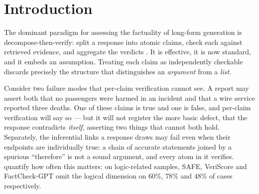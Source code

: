 \begin{abstract}
satisfies every satisfiable ladder ordering; we adopt it as the headline score, with the mean
marginal kept as the diagnostic that locates an incoherence. A third natural candidate is worse still, since a score
asking whether asserted relations are honoured is maximized by asserting nothing. Claim priors
come from an existing factuality pipeline, making coherence and factuality two stages over one
decomposition rather than competing scores. Empirically, on a corpus of response families whose
relative coherence ordering is fixed by construction, the readouts recover $82.7\%$ of the
declared orderings from gold relation graphs and $34.7$--$37.1\%$ from graphs mined out of the
response text; since the two conditions differ only in the relation graph, the gap localizes the open
problem in relation extraction rather than in the probabilistic model.
\end{abstract}

\section{Introduction}
\label{sec-intro}

The dominant paradigm for assessing the factuality of long-form generation is
decompose-then-verify: split a response into atomic claims, check each against retrieved
evidence, and aggregate the verdicts \citep{factscore,safe,veriscore}. It is effective, it is now
standard, and it embeds an assumption. Treating each claim as independently checkable discards
precisely the structure that distinguishes an \emph{argument} from a \emph{list}.

Consider two failure modes that per-claim verification cannot see. A report may assert both that
no passengers were harmed in an incident and that a wire service reported three deaths. One of
these claims is true and one is false, and per-claim verification will say so --- but it will not
register the more basic defect, that the response contradicts \emph{itself}, asserting two things
that cannot both hold. Separately, the inferential links a response draws may fail even when
their endpoints are individually true: a chain of accurate statements joined by a spurious
``therefore'' is not a sound argument, and every atom in it verifies. \citet{lorefact} quantify
how often this matters: on logic-related samples, SAFE, VeriScore and FactCheck-GPT omit the
logical dimension on $60\%$, $78\%$ and $48\%$ of cases respectively.

